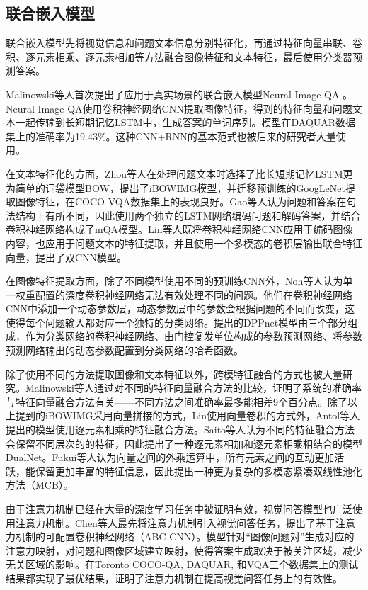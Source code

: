 \subsection{联合嵌入模型}
联合嵌入模型先将视觉信息和问题文本信息分别特征化，再通过特征向量串联、卷积、逐元素相乘、逐元素相加等方法融合图像特征和文本特征，最后使用分类器预测答案。

Malinowski等人首次提出了应用于真实场景的联合嵌入模型Neural-Image-QA
。Neural-Image-QA使用卷积神经网络CNN提取图像特征，得到的特征向量和问题文本一起传输到长短期记忆LSTM中，生成答案的单词序列。模型在DAQUAR数据集上的准确率为19.43\%。这种CNN+RNN的基本范式也被后来的研究者大量使用。

在文本特征化的方面，Zhou等人在处理问题文本时选择了比长短期记忆LSTM更为简单的词袋模型BOW，提出了iBOWIMG模型，并迁移预训练的GoogLeNet提取图像特征，在COCO-VQA数据集上的表现良好。Gao等人认为问题和答案在句法结构上有所不同，因此使用两个独立的LSTM网络编码问题和解码答案，并结合卷积神经网络构成了mQA模型。Lin等人既将卷积神经网络CNN应用于编码图像内容，也应用于问题文本的特征提取，并且使用一个多模态的卷积层输出联合特征向量，提出了双CNN模型。

在图像特征提取方面，除了不同模型使用不同的预训练CNN外，Noh等人认为单一权重配置的深度卷积神经网络无法有效处理不同的问题。他们在卷积神经网络CNN中添加一个动态参数层，动态参数层中的参数会根据问题的不同而改变，这使得每个问题输入都对应一个独特的分类网络。提出的DPPnet模型由三个部分组成，作为分类网络的卷积神经网络、由门控复发单位构成的参数预测网络、将参数预测网络输出的动态参数配置到分类网络的哈希函数。

除了使用不同的方法提取图像和文本特征以外，跨模特征融合的方式也被大量研究。Malinowski等人通过对不同的特征向量融合方法的比较，证明了系统的准确率与特征向量融合方法有关——不同方法之间准确率最多能相差9个百分点。除了以上提到的iBOWIMG采用向量拼接的方式，Lin使用向量卷积的方式外，Antol等人提出的模型使用逐元素相乘的特征融合方法。Saito等人认为不同的特征融合方法会保留不同层次的的特征，因此提出了一种逐元素相加和逐元素相乘相结合的模型DualNet。Fukui等人认为向量之间的外乘运算中，所有元素之间的互动更加活跃，能保留更加丰富的特征信息，因此提出一种更为复杂的多模态紧凑双线性池化方法（MCB）。

由于注意力机制已经在大量的深度学习任务中被证明有效，视觉问答模型也广泛使用注意力机制。Chen等人最先将注意力机制引入视觉问答任务，提出了基于注意力机制的可配置卷积神经网络（ABC-CNN）。模型针对“图像问题对”生成对应的注意力映射，对问题和图像区域建立映射，使得答案生成取决于被关注区域，减少无关区域的影响。在Toronto COCO-QA, DAQUAR, 和VQA三个数据集上的测试结果都实现了最优结果，证明了注意力机制在提高视觉问答任务上的有效性。

